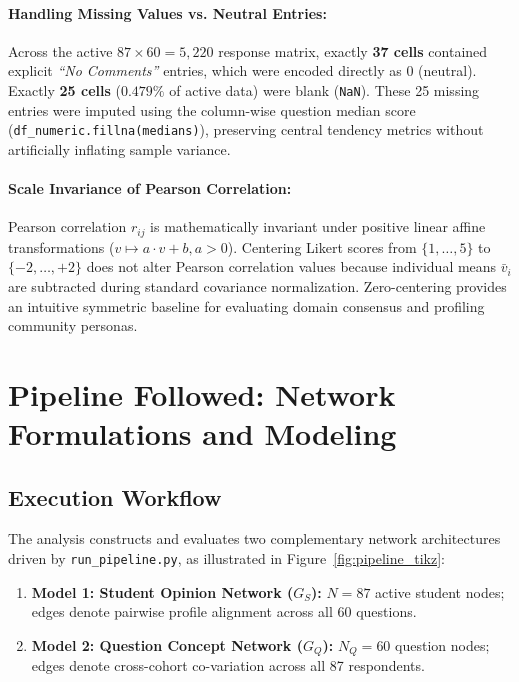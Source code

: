 \documentclass[10pt,twocolumn,a4paper]{article}
\begin{document}
\paragraph{Handling Missing Values vs. Neutral Entries:}
Across the active $87 \times 60 = 5,220$ response matrix, exactly \textbf{37 cells} contained explicit \textit{``No Comments''} entries, which were encoded directly as $0$ (neutral). Exactly \textbf{25 cells} ($0.479\%$ of active data) were blank (\texttt{NaN}). These 25 missing entries were imputed using the column-wise question median score (\texttt{df\_numeric.fillna(medians)}), preserving central tendency metrics without artificially inflating sample variance.

\paragraph{Scale Invariance of Pearson Correlation:}
Pearson correlation $r_{ij}$ is mathematically invariant under positive linear affine transformations ($v \mapsto a \cdot v + b, a > 0$). Centering Likert scores from $\{1, \dots, 5\}$ to $\{-2, \dots, +2\}$ does not alter Pearson correlation values because individual means $\bar{v}_i$ are subtracted during standard covariance normalization. Zero-centering provides an intuitive symmetric baseline for evaluating domain consensus and profiling community personas.

\section{Pipeline Followed: Network Formulations and Modeling}
\label{sec:pipeline}

\subsection{Execution Workflow}
The analysis constructs and evaluates two complementary network architectures driven by \texttt{run\_pipeline.py}, as illustrated in Figure~\ref{fig:pipeline_tikz}:
\begin{enumerate}[noitemsep,topsep=1pt,leftmargin=1.2em]
    \item \textbf{Model 1: Student Opinion Network ($G_S$):} $N=87$ active student nodes; edges denote pairwise profile alignment across all 60 questions.
    \item \textbf{Model 2: Question Concept Network ($G_Q$):} $N_Q=60$ question nodes; edges denote cross-cohort co-variation across all 87 respondents.
\end{enumerate}
\end{document}
